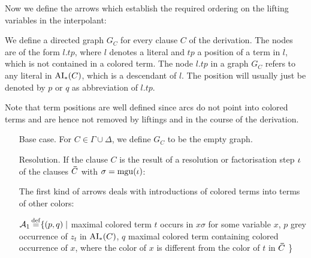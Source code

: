\documentclass[,%
	draft=false,%
	numbers=noendperiod
	11pt,
	a4paper,
	oneside,%
	openany,
]{memoir}
\begin{document}
Now we define the arrows which
establish the required ordering on the lifting variables in the interpolant:

\begin{defi}
	We define a directed graph $G_C$ for every clause $C$ of the derivation.
	The nodes are of the form $l.tp$, where $l$ denotes a literal and $tp$ a position of a term in $l$, which is not contained in a colored term.
	The node $l.tp$ in a graph $G_C$ refers to any literal in $\operatorname{AI}_\mathrm{*}(C)$,
	which is a descendant of $l$.
	The position will usually just be denoted by $p$ or $q$ as abbreviation of $l.tp$.

	Note that term positions are well defined since arcs do not point into colored terms and are hence not removed by liftings and in the course of the derivation.

	\label{def:arrows}
	\begin{itemize}
		\item[Base case.]
			For $C \in \Gamma\cup\Delta$, we define $G_C$ to be the empty graph.

		\item[Resolution.]
			If the clause $C$ is the result of a resolution or factorisation step $\iota$ of the clauses $\bm\bar C$ with $\sigma = \operatorname{mgu}(\iota)$:




			The first kind of arrows deals with introductions of colored terms into terms of other colors:

			$\operatorname{\mathcal{A}}_1 \operatorname{\stackrel{\mathrm{def}}{=}} \{ (p, q) \mid $ maximal colored term $t$ occurs in $x\sigma$ for some variable $x$, $p$ grey occurrence of $z_t$ in $\operatorname{AI}_\mathrm{*}(C)$, $q$ maximal colored term containing colored occurrence of $x$, where the color of $x$ is different from the color of $t$ in $\bm\bar C$ \}


\end{itemize}
\end{defi}
\end{document}
